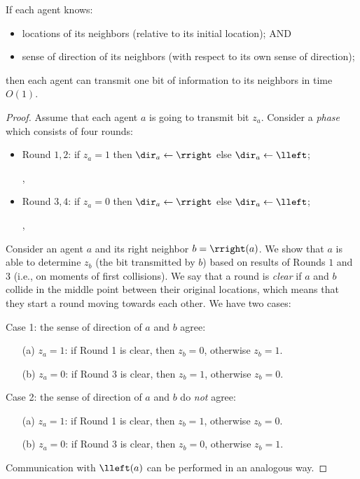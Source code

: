 \begin{proposition}\label{prop:communication}
If each agent knows:
\begin{itemize}
\item
\vspace{-5pt}
locations of its neighbors (relative to its initial location); AND
\item
\vspace{-5pt}
sense of direction of its neighbors (with respect to its own sense of direction);
\end{itemize}
then each agent can transmit one bit of information
to its neighbors in time $O(1)$.
\end{proposition}
\iffull
\begin{proof}
Assume that each agent $a$ is going to transmit bit $z_a$. Consider a {\em phase}
which consists of four rounds:
\begin{itemize}
\item Round $1,2$: if $z_a=1$ then $\dir_a\gets \rright$ else $\dir_a\gets \lleft$;

\SingleRound, \ReversedRound

\item Round $3,4$: if $z_a=0$ then $\dir_a\gets \rright$ else $\dir_a\gets \lleft$;

\SingleRound, \ReversedRound
\end{itemize}
Consider an agent $a$ and its right neighbor $b=\rright(a)$. We show that $a$ is able
to determine $z_b$ (the bit transmitted by $b$) based on results of Rounds $1$ and $3$ (i.e., on moments of first
collisions). We say that a round is {\em clear} if $a$ and $b$ collide in the middle point
between their original locations, which means that they start a round moving towards
each other.
We have two cases:

\noindent Case 1: the sense of direction of $a$ and $b$ agree:
 \begin{enumerate}
 \item[(a)]
 $z_a=1$: if Round 1 is clear, then $z_b=0$, otherwise $z_b=1$.
 \item[(b)]
 $z_a=0$: if Round 3 is clear, then $z_b=1$, otherwise $z_b=0$.
 \end{enumerate}

\noindent Case 2: the sense of direction of $a$ and $b$ do {\em not} agree:
 \begin{enumerate}
 \item[(a)]
 $z_a=1$: if Round 1 is clear, then $z_b=1$, otherwise $z_b=0$.
 \item[(b)]
 $z_a=0$: if Round 3 is clear, then $z_b=0$, otherwise $z_b=1$.
 \end{enumerate}

Communication with $\lleft(a)$ can be performed in an analogous way.

\end{proof}
